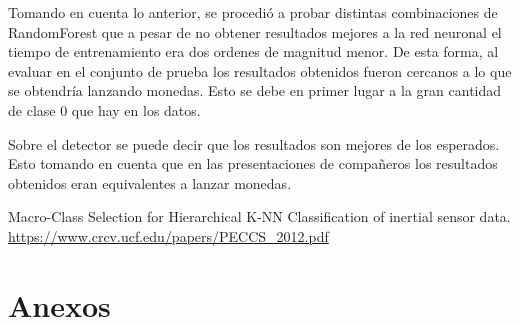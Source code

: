 \par Tomando en cuenta lo anterior, se procedió a probar distintas combinaciones de RandomForest que a pesar de no obtener resultados mejores a la red neuronal el tiempo de entrenamiento era dos ordenes de magnitud menor. De esta forma, al evaluar en el conjunto de prueba los resultados obtenidos fueron cercanos a lo que se obtendría lanzando monedas. Esto se debe en primer lugar a la gran cantidad de clase 0 que hay en los datos. 

\par Sobre el detector se puede decir que los resultados son mejores de los esperados. Esto tomando en cuenta que en las presentaciones de  compañeros los resultados obtenidos eran equivalentes a lanzar monedas.






\newpage
\begin{thebibliography}{X}
     Macro-Class Selection for Hierarchical K-NN Classification of inertial sensor data. \\
    \url{https://www.crcv.ucf.edu/papers/PECCS_2012.pdf} 

\end{thebibliography}

\section{Anexos}

